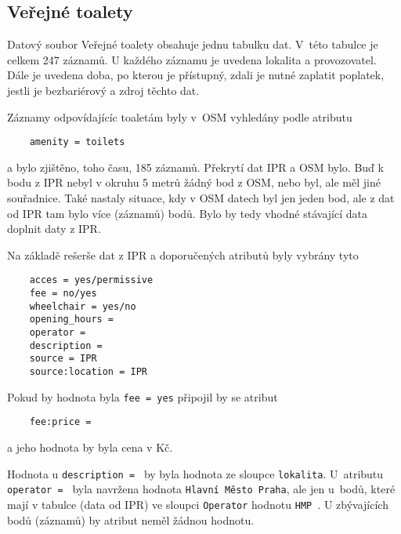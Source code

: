 \subsection{Veřejné toalety}
\label{Veřejné toalety}
Datový soubor Veřejné toalety obsahuje jednu tabulku dat. V~této
tabulce je celkem 247 záznamů. U každého záznamu je uvedena lokalita a
provozovatel. Dále je uvedena doba, po kterou je přístupný, zdali je
nutné zaplatit poplatek, jestli je bezbariérový a zdroj těchto dat.

Záznamy odpovídajícíc toaletám byly v~OSM vyhledány podle atributu
\begin{verbatim}
    amenity = toilets
\end{verbatim}

a bylo zjištěno, toho času, 185 záznamů. Překrytí dat IPR a OSM bylo.
Buď k bodu z IPR nebyl v okruhu 5 metrů žádný bod z OSM, nebo
byl, ale měl jiné souřadnice. Také nastaly situace, kdy v OSM
datech byl jen jeden bod, ale z dat od IPR tam bylo více (záznamů) 
bodů. Bylo by tedy vhodné stávající data doplnit daty z IPR.

Na základě rešerše dat z IPR a doporučených atributů byly vybrány tyto
\begin{verbatim}
    acces = yes/permissive
    fee = no/yes
    wheelchair = yes/no
    opening_hours =
    operator =
    description =
    source = IPR
    source:location = IPR
\end{verbatim}
Pokud by hodnota byla {\tt fee~=~yes} připojil by se atribut
\begin{verbatim}
    fee:price =
\end{verbatim}
a jeho hodnota by byla cena v Kč.

Hodnota u {\tt description~= } by byla hodnota ze sloupce
{\tt lokalita}. U~atributu {\tt operator~= } byla navržena hodnota
{\tt Hlavní Město Praha}, ale jen u~bodů, které mají v tabulce
(data od IPR) ve sloupci {\tt Operator} hodnotu {\tt HMP }.
U zbývajících bodů (záznamů) by atribut neměl žádnou hodnotu.


